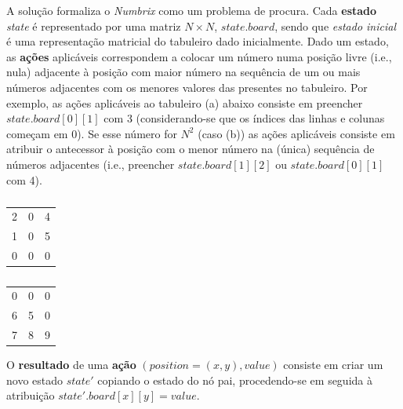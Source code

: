\documentclass[12pt]{exam}
\renewcommand\_{\textunderscore\linebreak[1]}
\begin{document}
    \indent A solução formaliza o \textit{Numbrix} como um problema de procura. Cada \textbf{estado} \textit{state} é representado por uma matriz $N \times N$, $state.board$, sendo que \textit{estado inicial} é uma representação matricial do tabuleiro dado inicialmente. Dado um estado, as \textbf{ações} aplicáveis correspondem a colocar um número numa posição livre (i.e., nula) adjacente à posição com maior número na sequência de um ou mais números adjacentes com os menores valores das presentes no tabuleiro. Por exemplo, as ações aplicáveis ao tabuleiro (a) abaixo consiste em preencher $state.board[0][1]$ com 3 (considerando-se que os índices das linhas e colunas começam em 0). Se esse número for $N^2$ (caso (b)) as ações aplicáveis consiste em atribuir o antecessor à posição com o menor número na (única) sequência de números adjacentes (i.e., preencher $state.board[1][2]$ ou $state.board[0][1]$ com 4).
        \begin{table}[ht!]\centering\footnotesize
            \begin{subtable}{0.2\textwidth}
                \centering
                \begin{tabular}{ccc}
                    2 & 0 & 4 \\
                    1 & 0 & 5 \\
                    0 & 0 & 0
                \end{tabular}
                \caption{}
            \end{subtable}
            \begin{subtable}{0.2\textwidth}
                \centering
                \begin{tabular}{ccc}
                    0 & 0 & 0 \\
                    6 & 5 & 0 \\
                    7 & 8 & 9
                \end{tabular}
                \caption{}
            \end{subtable}
        \end{table}

        \indent O \textbf{resultado} de uma \textbf{ação} $(position = (x, y), value)$ consiste em criar um novo estado $state'$ copiando o estado do nó pai, procedendo-se em seguida à atribuição $state'.board[x][y] = value$.
\end{document}
